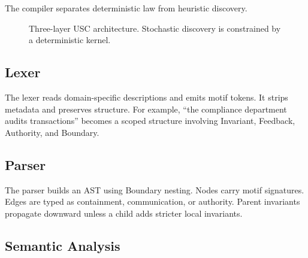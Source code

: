 \documentclass[11pt]{article}
\begin{document}
The compiler separates deterministic law from heuristic discovery.

\begin{figure}[h]
\centering
{}
\caption{Three-layer USC architecture. Stochastic discovery is constrained by a deterministic kernel.}
\end{figure}

\subsection{Lexer}

The lexer reads domain-specific descriptions and emits motif tokens. It strips
metadata and preserves structure. For example, ``the compliance department
audits transactions'' becomes a scoped structure involving Invariant,
Feedback, Authority, and Boundary.

\subsection{Parser}

The parser builds an AST using Boundary nesting. Nodes carry motif signatures.
Edges are typed as containment, communication, or authority. Parent invariants
propagate downward unless a child adds stricter local invariants.

\subsection{Semantic Analysis}
\end{document}
